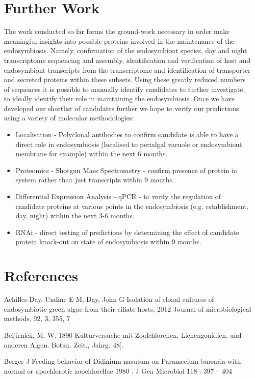 \documentclass[a4paper,11pt]{article}
\begin{document}
\section{Further Work}
The work conducted so far forms the ground-work necessary in order make meaningful insights into possible proteins involved in the maintenance of the endosymbiosis.
Namely, confirmation of the endosymbiont species, day and night transcriptome sequencing and assembly, identification and verification of host and endosymbiont transcripts from the transcriptome and identification of transporter and secreted proteins within these subsets.  
Using these greatly reduced numbers of sequences it is possible to manually identify candidates to further investigate, to ideally identify their role in maintaining the endosymbiosis.  
Once we have developed our shortlist of candidates further we hope to verify our predictions using a variety of molecular methodologies:
\begin{itemize}
  \item Localisation - Polyclonal antibodies to confirm candidate is able to have a direct role in endosymbiosis (localised to perialgal vacuole or endosymbiont membrane for example) within the next 6 months.
  \item Proteomics - Shotgun Mass Spectrometry - confirm presence of protein in system rather than just transcripts within 9 months.
  \item Differential Expression Analysis - qPCR - to verify the regulation of candidate proteins at various points in the endosymbiosis (e.g. establishment, day, night) within the next 3-6 months.
  \item RNAi - direct testing of predictions by determining the effect of candidate protein knock-out on state of endosymbiosis within 9 months.
\end{itemize}

\section{References}

\noindent Achilles-Day, Undine E M,  Day, John G Isolation of clonal cultures of endosymbiotic green algae from their ciliate hosts, 2012 Journal of microbiological methods,  92,  3, 355, 7

 
\noindent Beijirnick, M. W. 1890 Kulturversuche mit Zoolchlorellen, Lichengonidien, und anderen Algen. Botan. Zeit., Jahrg. 48].

 
\noindent Berger J  Feeding behavior of Didinium nasutum on Paramecium bursaria with normal or apochlorotic zoochlorellae 1980 . J Gen Microbiol 118 : 397 – 404
\end{document}

